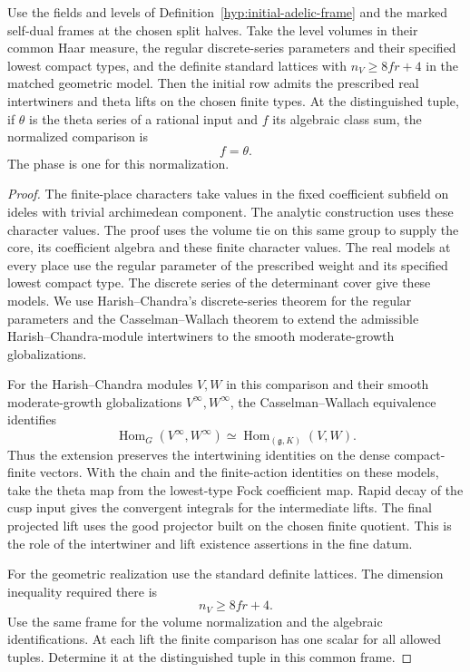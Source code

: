 \begin{proposition}
Use the fields and levels of Definition~\ref{hyp:initial-adelic-frame}
and the marked self-dual frames at the chosen split halves. Take the
level volumes in their common Haar measure, the regular discrete-series
parameters and their specified lowest compact types, and the definite
standard lattices with \(n_V\ge 8fr+4\) in the matched geometric model.
Then the initial row admits the prescribed real
intertwiners and theta lifts on the chosen finite types. At the distinguished tuple, if \(\theta\) is the theta series of a rational input and \(f\) its algebraic class sum, the normalized comparison is
\[
 f=\theta .
\]
The phase is one for this normalization.
\end{proposition}
\begin{proof}
The finite-place characters take values in the fixed coefficient
subfield on ideles with trivial archimedean component. The analytic construction
uses these character values. The proof uses the volume tie on this
same group to supply the core, its coefficient algebra and these
finite character values. The real models at every place use
the regular parameter of the prescribed weight and its
specified lowest compact type. The discrete series of the
determinant cover give these models. We use Harish--Chandra's
discrete-series theorem for the regular parameters and the
Casselman--Wallach theorem to extend the admissible
Harish--Chandra-module intertwiners to the smooth
moderate-growth globalizations.

For the Harish--Chandra modules \(V,W\) in this comparison and their
smooth moderate-growth globalizations \(V^\infty,W^\infty\), the
Casselman--Wallach equivalence identifies
\[
 \operatorname{Hom}_{G}(V^\infty,W^\infty)
       \simeq\operatorname{Hom}_{(\mathfrak g,K)}(V,W).
\]
Thus the extension preserves the intertwining
identities on the dense compact-finite vectors. With the
chain and the finite-action identities on these models, take
the theta map from the lowest-type Fock coefficient map.
Rapid decay of the cusp input gives the convergent integrals
for the intermediate lifts. The final projected lift uses the
good projector built on the chosen finite quotient. This is
the role of the intertwiner and lift existence assertions in
the fine datum. \cite{harish-chandra-degree,casselman-wallach}\label{cor:automorphic-realization-3}

For the geometric realization use the standard definite lattices.
The dimension inequality required there is
\[
                          n_V\ge8fr+4 .
\]
Use the same frame for the volume normalization and the algebraic
identifications. At each lift the finite comparison has one scalar for all allowed tuples. Determine it at the distinguished tuple in this common frame.


\end{proof}
